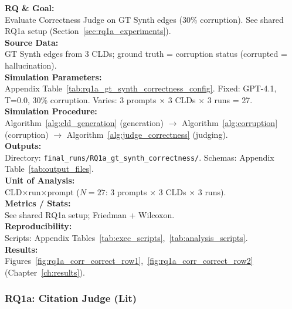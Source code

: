 \textbf{RQ \& Goal:}\\
Evaluate Correctness Judge on GT Synth edges (30\% corruption). See shared RQ1a setup (Section~\ref{sec:rq1a_experiments}).\\
\textbf{Source Data:}\\
GT Synth edges from 3 CLDs; ground truth = corruption status (corrupted = hallucination).\\
\textbf{Simulation Parameters:}\\
Appendix Table~\ref{tab:rq1a_gt_synth_correctness_config}. Fixed: GPT-4.1, T=0.0, 30\% corruption. Varies: 3 prompts $\times$ 3 CLDs $\times$ 3 runs = 27.\\
\textbf{Simulation Procedure:}\\
Algorithm~\ref{alg:cld_generation} (generation) $\rightarrow$ Algorithm~\ref{alg:corruption} (corruption) $\rightarrow$ Algorithm~\ref{alg:judge_correctness} (judging).\\
\textbf{Outputs:}\\
Directory: \texttt{final\_runs/RQ1a\_gt\_synth\_correctness/}. Schemas: Appendix Table~\ref{tab:output_files}.\\
\textbf{Unit of Analysis:}\\
CLD$\times$run$\times$prompt ($N=27$: 3 prompts $\times$ 3 CLDs $\times$ 3 runs).\\
\textbf{Metrics / Stats:}\\
See shared RQ1a setup; Friedman + Wilcoxon.\\
\textbf{Reproducibility:}\\
Scripts: Appendix Tables~\ref{tab:exec_scripts},~\ref{tab:analysis_scripts}.\\
\textbf{Results:}\\
Figures~\ref{fig:rq1a_corr_correct_row1},~\ref{fig:rq1a_corr_correct_row2} (Chapter~\ref{ch:results}).

\subsubsection{RQ1a: Citation Judge (Lit)}
\label{sec:rq1a_citation_lit}

